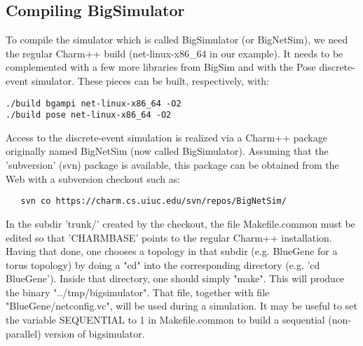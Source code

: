 \subsection{Compiling BigSimulator}

To compile the simulator which is called BigSimulator (or BigNetSim), we need
the regular Charm++ build (net-linux-x86\_64 in our example).  It needs to be
complemented with a few more libraries from BigSim and with the Pose
discrete-event simulator. These pieces can be built, respectively, with:

\begin{verbatim}
./build bgampi net-linux-x86_64 -O2
./build pose net-linux-x86_64 -O2
\end{verbatim}

Access to the discrete-event simulation is realized via a Charm++ package
originally named BigNetSim (now called BigSimulator). Assuming that the
'subversion' (svn) package is available, this package can be obtained from the
Web with a subversion checkout such as:

\begin{verbatim}
   svn co https://charm.cs.uiuc.edu/svn/repos/BigNetSim/
\end{verbatim}

In the subdir 'trunk/' created by the checkout, the file Makefile.common must
be edited so that 'CHARMBASE' points to the regular Charm++ installation.
Having that done, one chooses a topology in that subdir (e.g. BlueGene for a
torus topology) by doing a "cd" into the corresponding directory (e.g. 'cd
BlueGene').  Inside that directory, one should simply "make". This will produce
the binary "../tmp/bigsimulator". That file, together with file
"BlueGene/netconfig.vc", will be used during a simulation. It may be useful to
set the variable SEQUENTIAL to 1 in Makefile.common to build a sequential
(non-parallel) version of bigsimulator.

